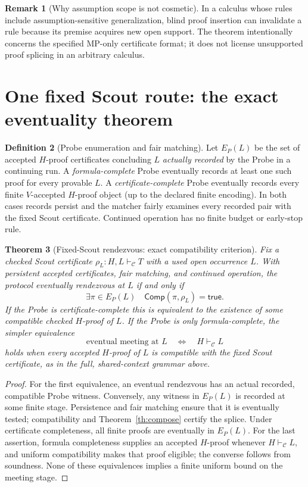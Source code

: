 \documentclass[11pt,letterpaper]{article}
\newtheorem{theorem}{Theorem}[section]
\theoremstyle{definition}
\newtheorem{definition}[theorem]{Definition}
\newtheorem{remark}[theorem]{Remark}
\newcommand{\vdC}{\vdash_{\mathcal C}}
\begin{document}
\begin{remark}[Why assumption scope is not cosmetic]
In a calculus whose rules include assumption-sensitive generalization,
blind proof insertion can invalidate a rule because its premise acquires
new open support. The theorem intentionally concerns the specified MP-only
certificate format; it does not license unsupported proof splicing in an
arbitrary calculus.
\end{remark}

\section{One fixed Scout route: the exact eventuality theorem}
\begin{definition}[Probe enumeration and fair matching]
Let $E_P(L)$ be the set of accepted $H$-proof certificates concluding
$L$ \emph{actually recorded} by the Probe in a continuing run. A
\emph{formula-complete} Probe eventually records at least one such proof
for every provable $L$. A \emph{certificate-complete} Probe eventually
records every finite $V$-accepted $H$-proof object (up to the declared
finite encoding). In both cases records persist and the matcher fairly
examines every recorded pair with the fixed Scout certificate. Continued
operation has no finite budget or early-stop rule.
\end{definition}

\begin{theorem}[Fixed-Scout rendezvous: exact compatibility criterion]
\label{th:fixed}
Fix a checked Scout certificate $\rho_L:H,L\vdC T$ with a used
open occurrence $L$. With persistent accepted certificates, fair matching,
and continued operation, the protocol eventually rendezvous at $L$ if
and only if
\[
   \exists\pi\in E_P(L)\quad\mathsf{Comp}(\pi,\rho_L)=\mathsf{true}.
\]
If the Probe is certificate-complete this is equivalent to the existence
of \emph{some} compatible checked $H$-proof of $L$. If the Probe is only
formula-complete, the simpler equivalence
\[
   \text{eventual meeting at $L$}\quad\Longleftrightarrow\quad H\vdC L
\]
holds when every accepted $H$-proof of $L$ is compatible with the fixed
Scout certificate, as in the full, shared-context grammar above.
\end{theorem}
\begin{proof}
For the first equivalence, an eventual rendezvous has an actual
recorded, compatible Probe witness. Conversely, any witness in $E_P(L)$
is recorded at some finite stage. Persistence and fair matching ensure
that it is eventually tested; compatibility and
Theorem~\ref{th:compose} certify the splice. Under certificate
completeness, all finite proofs are eventually in $E_P(L)$.
For the last assertion, formula completeness supplies an accepted
$H$-proof whenever $H\vdC L$, and uniform compatibility makes
that proof eligible; the converse follows from soundness. None of these
equivalences implies a finite uniform bound on the meeting stage.
\end{proof}
\end{document}
